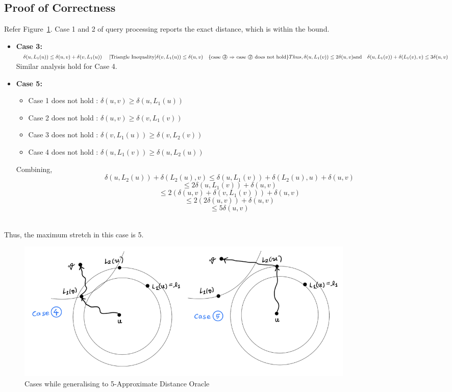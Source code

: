 \documentclass{article}
\begin{document}
\subsection{Proof of Correctness}
Refer Figure~\ref{fig:correctstretch}. Case 1 and 2 of query processing reports the exact distance, which is within the bound.
\begin{itemize}
    \item \textbf{Case 3:} \(\delta(u, L_1(u)) \leq \delta(u, v) + \delta(v, L_1(u))\quad \text{ [Triangle Inequality]}\\
    \delta(v, L_1(u)) \leq \delta(u, v) \quad \text{\{case \textcircled{3} $\Rightarrow$ case \textcircled{2} does not hold\}} \\
    Thus,  \delta(u, L_1(v)) \leq 2\delta(u, v) \\
    \text{and} \quad \delta(u, L_1(v)) + \delta(L_1(v), v) \leq 3\delta(u, v)\) \\
    Similar analysis hold for Case 4. 
    \item \textbf{Case 5:} 
\begin{itemize}
    \item Case 1 does not hold : $\delta(u,v) \geq \delta(u, L_1(u))$
    \item Case 2 does not hold : $\delta(u,v) \geq \delta(v, L_1(v))$
    \item Case 3 does not hold : $\delta(v, L_1(u)) \geq \delta(v, L_2(v))$
    \item Case 4 does not hold : $\delta(u, L_1(v)) \geq \delta(u, L_2(u))$
\end{itemize}

Combining,\[
\delta(u, L_2(u)) + \delta(L_2(u), v) 
\leq \delta(u, L_1(v)) + \delta(L_2(u), u) + \delta(u, v) \] 
\[\leq 2\delta(u, L_1(v)) + \delta(u, v) \]
\[\leq 2(\delta(u,v) + \delta(v, L_1(v))) + \delta(u, v)\] 
\[\leq 2(2\delta(u,v)) + \delta(u, v)\]
\[\leq 5\delta(u, v)\]\\
\end{itemize} 
Thus, the maximum stretch in this case is 5. 

\begin{figure}[hbt!]
    \begin{center}
        \includegraphics[width=0.8\textwidth]{img/correctstretch.png}
        \caption{Cases while generalising to 5-Approximate Distance Oracle}
        \label{fig:correctstretch}
    \end{center}
\end{figure}
\end{document}

